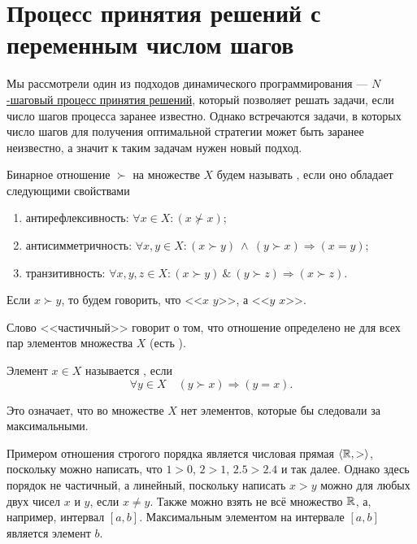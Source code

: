 \section{Процесс принятия решений с переменным числом шагов}

Мы рассмотрели один из подходов динамического программирования --- \hyperref[alg:n_step_process]{$N$-шаговый процесс принятия решений}, который позволяет решать задачи, если число шагов процесса заранее известно. Однако встречаются задачи, в которых число шагов для получения оптимальной стратегии может быть заранее неизвестно, а значит к таким задачам нужен новый подход.


Бинарное отношение $\succ$ на множестве $X$ будем называть , если оно обладает следующими свойствами

\begin{enumerate}[nosep]
	\item антирефлексивность: $\forall x \in X: (x \nsucc x)$;
		
	\item антисимметричность: $\forall x, y \in X: (x \succ y) \ \land \ (y \succ x) \Rightarrow (x = y)$;
	
	\item транзитивность: $\forall x, y, z \in X: (x \succ y) \ \& \ (y \succ z) \Rightarrow (x \succ z)$.
\end{enumerate}

Если $x \succ y$, то будем говорить, что <<$x$  $y$>>, а <<$y$  $x$>>.

\remark

Слово <<частичный>> говорит о том, что отношение определено не для всех пар элементов множества $X$ (есть ).


Элемент $x \in X$ называется , если
\[
\forall y \in X \quad (y \succ x) \Rightarrow (y=x).
\]

Это означает, что во множестве $X$ нет элементов, которые бы следовали за максимальными.

\example

Примером отношения строгого порядка является числовая прямая $\langle\mathbb{R}, >\rangle$, поскольку можно написать, что $1 > 0$, $2 > 1$, $2.5 > 2.4$ и так далее. Однако здесь порядок не частичный, а линейный, поскольку написать $x > y$ можно для любых двух чисел $x$ и $y$, если $x \neq y$. Также можно взять не всё множество $\mathbb{R}$, а, например, интервал $[a, b]$. Максимальным элементом на интервале $[a, b]$ является элемент $b$.

